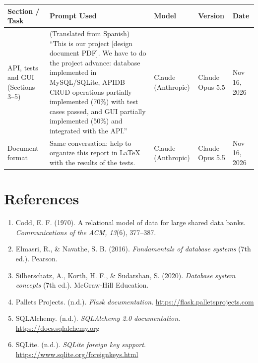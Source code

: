 \documentclass[11pt]{article}
\renewcommand{\_}{\oldus\allowbreak}
\begin{document}
\begin{center}
\small
\begin{tabular}{>{\raggedright}p{2.8cm} >{\raggedright}p{6.2cm} >{\raggedright}p{1.9cm} >{\raggedright}p{1.6cm} >{\raggedright\arraybackslash}p{1.8cm}}
\toprule
\textbf{Section / Task} & \textbf{Prompt Used} & \textbf{Model} & \textbf{Version} & \textbf{Date} \\
\midrule
API, tests and GUI (Sections 3--5) & (Translated from Spanish) ``This is our project [design document PDF]. We have to do the project advance: database implemented in MySQL/SQLite, APIDB CRUD operations partially implemented (70\%) with test cases passed, and GUI partially implemented (50\%) and integrated with the API.'' & Claude (Anthropic) & Claude Opus 5.5 & Nov 16, 2026 \\
Document format & Same conversation: help to organize this report in LaTeX with the results of the tests. & Claude (Anthropic) & Claude Opus 5.5 & Nov 16, 2026 \\
\bottomrule
\end{tabular}
\end{center}

\section{References}

\begin{enumerate}[itemsep=0.2em]
  \item Codd, E. F. (1970). A relational model of data for large shared data banks. \textit{Communications of the ACM, 13}(6), 377--387.
  \item Elmasri, R., \& Navathe, S. B. (2016). \textit{Fundamentals of database systems} (7th ed.). Pearson.
  \item Silberschatz, A., Korth, H. F., \& Sudarshan, S. (2020). \textit{Database system concepts} (7th ed.). McGraw-Hill Education.
  \item Pallets Projects. (n.d.). \textit{Flask documentation}. \url{https://flask.palletsprojects.com}
  \item SQLAlchemy. (n.d.). \textit{SQLAlchemy 2.0 documentation}. \url{https://docs.sqlalchemy.org}
  \item SQLite. (n.d.). \textit{SQLite foreign key support}. \url{https://www.sqlite.org/foreignkeys.html}
\end{enumerate}
\end{document}
